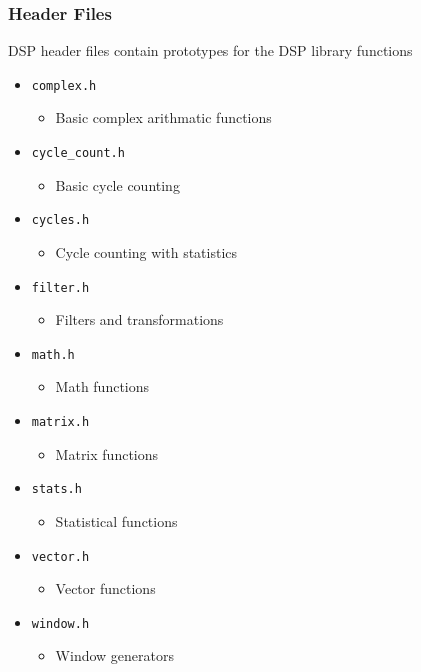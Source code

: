 \subsubsection{Header Files}
DSP header files contain prototypes for the DSP library functions
\begin{itemize}
	\item \texttt{complex.h}
	\begin{itemize}
		\item Basic complex arithmatic functions
	\end{itemize}
	\item \texttt{cycle_count.h}
	\begin{itemize}
		\item Basic cycle counting
	\end{itemize}
	\item \texttt{cycles.h}
	\begin{itemize}
		\item Cycle counting with statistics
	\end{itemize}
	\item \texttt{filter.h}
	\begin{itemize}
		\item Filters and transformations
	\end{itemize}
	\item \texttt{math.h}
	\begin{itemize}
		\item Math functions
	\end{itemize}
	\item \texttt{matrix.h}
	\begin{itemize}
		\item Matrix functions
	\end{itemize}
	\item \texttt{stats.h}
	\begin{itemize}
		\item Statistical functions
	\end{itemize}
	\item \texttt{vector.h}
	\begin{itemize}
		\item Vector functions
	\end{itemize}
		\item \texttt{window.h}
	\begin{itemize}
		\item Window generators
	\end{itemize}
\end{itemize}


